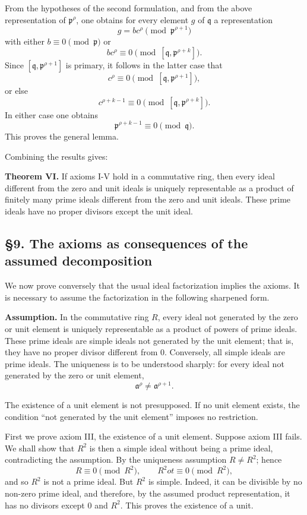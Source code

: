 \documentclass[11pt]{article}
\begin{document}
From the hypotheses of the second formulation, and from the above
representation of \(\mathfrak p^{\rho}\), one obtains for every element
\(g\) of \(\mathfrak q\) a representation \[
  g=b c^{\rho} \pmod{\mathfrak p^{\rho+1}}
\] with either \(b\equiv0\pmod{\mathfrak p}\) or \[
  b c^{\rho}\equiv0\pmod{[\mathfrak q,\mathfrak p^{\rho+k}]}.
\] Since \([\mathfrak q,\mathfrak p^{\rho+1}]\) is primary, it follows
in the latter case that \[
  c^{\rho}\equiv0\pmod{[\mathfrak q,\mathfrak p^{\rho+1}]},
\] or else \[
  c^{\rho+k-1}\equiv0\pmod{[\mathfrak q,\mathfrak p^{\rho+k}]}.
\] In either case one obtains \[
  \mathfrak p^{\rho+k-1}\equiv0\pmod{\mathfrak q}.
\] This proves the general lemma.

Combining the results gives:

\textbf{Theorem VI.} If axioms I-V hold in a commutative ring, then
every ideal different from the zero and unit ideals is uniquely
representable as a product of finitely many prime ideals different from
the zero and unit ideals. These prime ideals have no proper divisors
except the unit ideal.

\subsection{§9. The axioms as consequences of the assumed
decomposition}\label{the-axioms-as-consequences-of-the-assumed-decomposition}

We now prove conversely that the usual ideal factorization implies the
axioms. It is necessary to assume the factorization in the following
sharpened form.

\textbf{Assumption.} In the commutative ring \(R\), every ideal not
generated by the zero or unit element is uniquely representable as a
product of powers of prime ideals. These prime ideals are simple ideals
not generated by the unit element; that is, they have no proper divisor
different from \(0\). Conversely, all simple ideals are prime ideals.
The uniqueness is to be understood sharply: for every ideal not
generated by the zero or unit element, \[
  \mathfrak a^{\rho}\ne\mathfrak a^{\rho+1}.
\]

The existence of a unit element is not presupposed. If no unit element
exists, the condition ``not generated by the unit element'' imposes no
restriction.

First we prove axiom III, the existence of a unit element. Suppose axiom
III fails. We shall show that \(R^2\) is then a simple ideal without
being a prime ideal, contradicting the assumption. By the uniqueness
assumption \(R\ne R^2\); hence \[
  R\equiv0\pmod{R^2},
  \qquad R^2
ot\equiv0\pmod{R^2},
\] and so \(R^2\) is not a prime ideal. But \(R^2\) is simple. Indeed,
it can be divisible by no non-zero prime ideal, and therefore, by the
assumed product representation, it has no divisors except \(0\) and
\(R^2\). This proves the existence of a unit.
\end{document}
